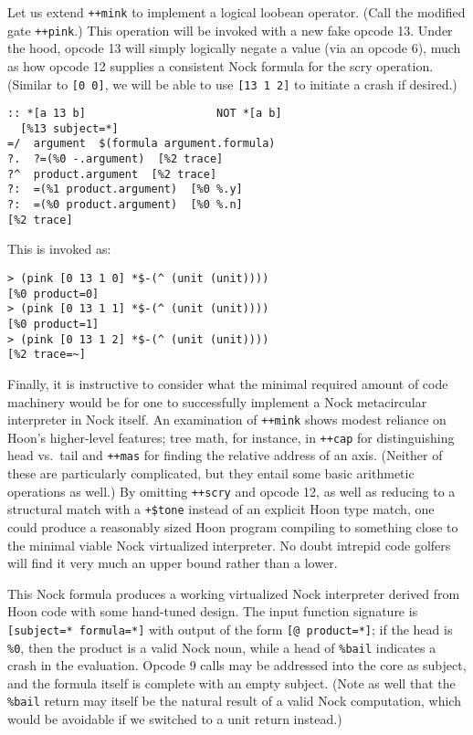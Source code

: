 \documentclass[twoside]{article}
\begin{document}
Let us extend \lstinline[style=inlinecode]{++mink} to implement a logical loobean operator.  (Call the modified gate \lstinline[style=inlinecode]{++pink}.)  This operation will be invoked with a new fake opcode 13.  Under the hood, opcode 13 will simply logically negate a value (via an opcode 6), much as how opcode 12 supplies a consistent Nock formula for the scry operation.  (Similar to \lstinline[style=inlinecode]{[0 0]}, we will be able to use \lstinline[style=inlinecode]{[13 1 2]} to initiate a crash if desired.)

\begin{lstlisting}[style=listingcode]
:: *[a 13 b]                    NOT *[a b]
  [%13 subject=*]
=/  argument  $(formula argument.formula)
?.  ?=(%0 -.argument)  [%2 trace]
?^  product.argument  [%2 trace]
?:  =(%1 product.argument)  [%0 %.y]
?:  =(%0 product.argument)  [%0 %.n]
[%2 trace]
\end{lstlisting}

This is invoked as:

\begin{lstlisting}[style=listingcode]
> (pink [0 13 1 0] *$-(^ (unit (unit))))
[%0 product=0]
> (pink [0 13 1 1] *$-(^ (unit (unit))))
[%0 product=1]
> (pink [0 13 1 2] *$-(^ (unit (unit))))
[%2 trace=~]
\end{lstlisting}

Finally, it is instructive to consider what the minimal required amount of code machinery would be for one to successfully implement a Nock metacircular interpreter in Nock itself.  An examination of \lstinline[style=inlinecode]{++mink} shows modest reliance on Hoon's higher-level features; tree math, for instance, in \lstinline[style=inlinecode]{++cap} for distinguishing head vs.\ tail and \lstinline[style=inlinecode]{++mas} for finding the relative address of an axis.  (Neither of these are particularly complicated, but they entail some basic arithmetic operations as well.)  By omitting \lstinline[style=inlinecode]{++scry} and opcode 12, as well as reducing to a structural match with a \lstinline[style=inlinecode]{+$tone} instead of an explicit Hoon type match, one could produce a reasonably sized Hoon program compiling to something close to the minimal viable Nock virtualized interpreter.  No doubt intrepid code golfers will find it very much an upper bound rather than a lower.

This Nock formula produces a working virtualized Nock interpreter derived from Hoon code with some hand-tuned design.  The input function signature is \lstinline[style=inlinecode]{[subject=* formula=*]} with output of the form \lstinline[style=inlinecode]{[@ product=*]}; if the head is \lstinline[style=inlinecode]{%0}, then the product is a valid Nock noun, while a head of \lstinline[style=inlinecode]{%bail} indicates a crash in the evaluation.  Opcode 9 calls may be addressed into the core as subject, and the formula itself is complete with an empty subject.  (Note as well that the \lstinline[style=inlinecode]{%bail} return may itself be the natural result of a valid Nock computation, which would be avoidable if we switched to a unit return instead.)
\end{document}
